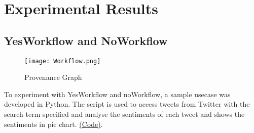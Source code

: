 \documentclass[6pt,,a4paper]{article}
\begin{document}
\section{\textbf{Experimental Results}}
\subsection{\textbf{ YesWorkflow and NoWorkflow}}
\vspace{-10mm}
\begin{figure}[h]
\begin{center}
            \texttt{[image: Workflow.png]}
\end{center}
\centering
\caption{ Provenance Graph}
\end{figure}
\break
To experiment with YesWorkflow and noWorkflow, a sample usecase was developed in Python. The script is used to access tweets from Twitter with the search term specified and analyse the sentiments of each tweet and shows the sentiments in pie chart. \href{https://docs.google.com/document/d/1H9p04oypDPEiuzP6qKz8Pvn0xDusqKXYqDvS_PeXB6o/edit}{(Code)}.
\vspace{-4mm}
\end{document}
